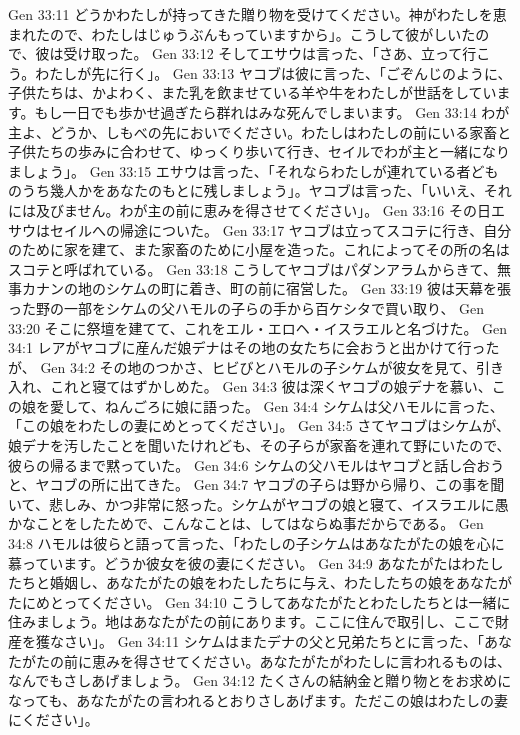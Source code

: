 Gen 33:11  どうかわたしが持ってきた贈り物を受けてください。神がわたしを恵まれたので、わたしはじゅうぶんもっていますから」。こうして彼がしいたので、彼は受け取った。
Gen 33:12  そしてエサウは言った、「さあ、立って行こう。わたしが先に行く」。
Gen 33:13  ヤコブは彼に言った、「ごぞんじのように、子供たちは、かよわく、また乳を飲ませている羊や牛をわたしが世話をしています。もし一日でも歩かせ過ぎたら群れはみな死んでしまいます。
Gen 33:14  わが主よ、どうか、しもべの先においでください。わたしはわたしの前にいる家畜と子供たちの歩みに合わせて、ゆっくり歩いて行き、セイルでわが主と一緒になりましょう」。
Gen 33:15  エサウは言った、「それならわたしが連れている者どものうち幾人かをあなたのもとに残しましょう」。ヤコブは言った、「いいえ、それには及びません。わが主の前に恵みを得させてください」。
Gen 33:16  その日エサウはセイルへの帰途についた。
Gen 33:17  ヤコブは立ってスコテに行き、自分のために家を建て、また家畜のために小屋を造った。これによってその所の名はスコテと呼ばれている。
Gen 33:18  こうしてヤコブはパダンアラムからきて、無事カナンの地のシケムの町に着き、町の前に宿営した。
Gen 33:19  彼は天幕を張った野の一部をシケムの父ハモルの子らの手から百ケシタで買い取り、
Gen 33:20  そこに祭壇を建てて、これをエル・エロヘ・イスラエルと名づけた。
Gen 34:1  レアがヤコブに産んだ娘デナはその地の女たちに会おうと出かけて行ったが、
Gen 34:2  その地のつかさ、ヒビびとハモルの子シケムが彼女を見て、引き入れ、これと寝てはずかしめた。
Gen 34:3  彼は深くヤコブの娘デナを慕い、この娘を愛して、ねんごろに娘に語った。
Gen 34:4  シケムは父ハモルに言った、「この娘をわたしの妻にめとってください」。
Gen 34:5  さてヤコブはシケムが、娘デナを汚したことを聞いたけれども、その子らが家畜を連れて野にいたので、彼らの帰るまで黙っていた。
Gen 34:6  シケムの父ハモルはヤコブと話し合おうと、ヤコブの所に出てきた。
Gen 34:7  ヤコブの子らは野から帰り、この事を聞いて、悲しみ、かつ非常に怒った。シケムがヤコブの娘と寝て、イスラエルに愚かなことをしたためで、こんなことは、してはならぬ事だからである。
Gen 34:8  ハモルは彼らと語って言った、「わたしの子シケムはあなたがたの娘を心に慕っています。どうか彼女を彼の妻にください。
Gen 34:9  あなたがたはわたしたちと婚姻し、あなたがたの娘をわたしたちに与え、わたしたちの娘をあなたがたにめとってください。
Gen 34:10  こうしてあなたがたとわたしたちとは一緒に住みましょう。地はあなたがたの前にあります。ここに住んで取引し、ここで財産を獲なさい」。
Gen 34:11  シケムはまたデナの父と兄弟たちとに言った、「あなたがたの前に恵みを得させてください。あなたがたがわたしに言われるものは、なんでもさしあげましょう。
Gen 34:12  たくさんの結納金と贈り物とをお求めになっても、あなたがたの言われるとおりさしあげます。ただこの娘はわたしの妻にください」。
